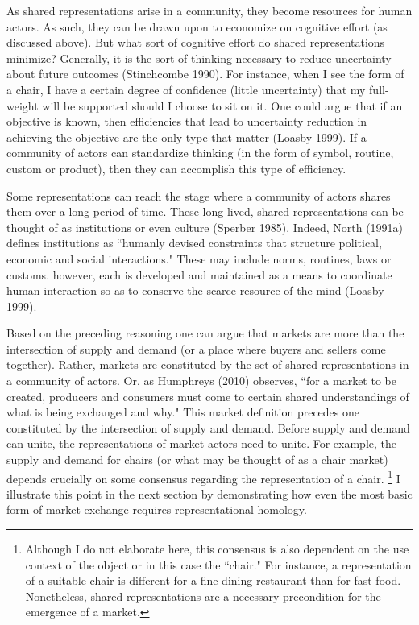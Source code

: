 As shared representations arise in a community, they become resources for human actors. As such, they can be drawn upon to economize on cognitive effort (as discussed above). But what sort of cognitive effort do shared representations minimize? Generally, it is the sort of thinking necessary to reduce uncertainty about future outcomes (Stinchcombe 1990). For instance, when I see the form of a chair, I have a certain degree of confidence (little uncertainty) that my full-weight will be supported should I choose to sit on it. One could argue that if an objective is known, then efficiencies that lead to uncertainty reduction in achieving the objective are the only type that matter (Loasby 1999). If a community of actors can standardize thinking (in the form of symbol, routine, custom or product), then they can accomplish this type of efficiency. 

Some representations can reach the stage where a community of actors shares them over a long period of time. These long-lived, shared representations can be thought of as institutions or even culture (Sperber 1985). Indeed, North (1991a) defines institutions as ``humanly devised constraints that structure political, economic and social interactions."  These may include norms, routines, laws or customs. however, each is developed and maintained as a means to coordinate human interaction so as to conserve the scarce resource of the mind (Loasby 1999). 

Based on the preceding reasoning one can argue that markets are more than the intersection of supply and demand (or a place where buyers and sellers come together).  Rather, markets are constituted by the set of shared representations in a community of actors. Or, as Humphreys (2010) observes, ``for a market to be created, producers and consumers must come to certain shared understandings of what is being exchanged and why." This market definition precedes one constituted by the intersection of supply and demand. Before supply and demand can unite, the representations of market actors need to unite. For example, the supply and demand for chairs (or what may be thought of as a chair market) depends crucially on some consensus regarding the representation of a chair. \footnote{Although I do not elaborate here, this consensus is also dependent on the use context of the object or in this case the ``chair." For instance, a representation of a suitable chair is different for a fine dining restaurant than for fast food. Nonetheless, shared representations are a necessary precondition for the emergence of a market.} I illustrate this point in the next section by demonstrating how even the most basic form of market exchange requires representational homology. 

